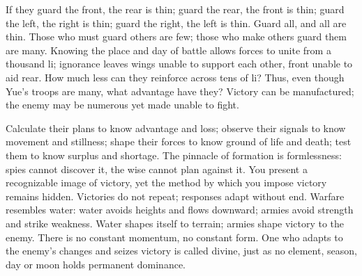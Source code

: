 \documentclass[12pt]{book}
\begin{document}
{If they guard the front, the rear is thin; guard the rear, the front is thin; guard the left, the right is thin; guard the right, the left is thin. Guard all, and all are thin. Those who must guard others are few; those who make others guard them are many. Knowing the place and day of battle allows forces to unite from a thousand li; ignorance leaves wings unable to support each other, front unable to aid rear. How much less can they reinforce across tens of li? Thus, even though Yue’s troops are many, what advantage have they? Victory can be manufactured; the enemy may be numerous yet made unable to fight.

Calculate their plans to know advantage and loss; observe their signals to know movement and stillness; shape their forces to know ground of life and death; test them to know surplus and shortage. The pinnacle of formation is formlessness: spies cannot discover it, the wise cannot plan against it. You present a recognizable image of victory, yet the method by which you impose victory remains hidden. Victories do not repeat; responses adapt without end. Warfare resembles water: water avoids heights and flows downward; armies avoid strength and strike weakness. Water shapes itself to terrain; armies shape victory to the enemy. There is no constant momentum, no constant form. One who adapts to the enemy’s changes and seizes victory is called divine, just as no element, season, day or moon holds permanent dominance.}
\end{document}
